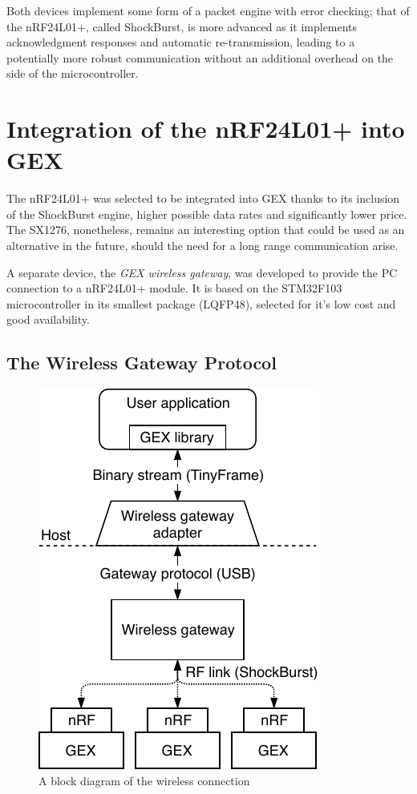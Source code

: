 Both devices implement some form of a packet engine with error checking; that of the nRF24L01+, called ShockBurst, is more advanced as it implements acknowledgment responses and automatic re-transmission, leading to a potentially more robust communication without an additional overhead on the side of the microcontroller. 


\section{Integration of the nRF24L01+ into GEX}

The nRF24L01+ was selected to be integrated into GEX thanks to its inclusion of the ShockBurst engine, higher possible data rates and significantly lower price. The SX1276, nonetheless, remains an interesting option that could be used as an alternative in the future, should the need for a long range communication arise.

A separate device, the \textit{GEX wireless gateway}, was developed to provide the PC connection to a nRF24L01+ module. It is based on the STM32F103 microcontroller in its smallest package (LQFP48), selected for it's low cost and good availability.

\subsection{The Wireless Gateway Protocol}

\begin{figure}
	\vspace{-1em}
	\centering
	\includegraphics[scale=0.9]{img/rf-gw.pdf}
	\caption{A block diagram of the wireless connection}
\end{figure}

